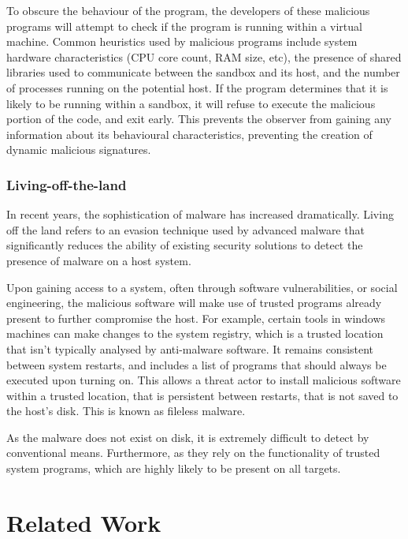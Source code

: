 \documentclass{report}
\begin{document}
To obscure the behaviour of the program, the developers of these malicious programs will attempt to check if the program is running within a virtual machine. Common heuristics used by malicious programs include system hardware characteristics (CPU core count, RAM size, etc), the presence of shared libraries used to communicate between the sandbox and its host, and the number of processes running on the potential host. If the program determines that it is likely to be running within a sandbox, it will refuse to execute the malicious portion of the code, and exit early. This prevents the observer from gaining any information about its behavioural characteristics, preventing the creation of dynamic malicious signatures. 

\subsubsection{Living-off-the-land}

In recent years, the sophistication of malware has increased dramatically. Living off the land refers to an evasion technique used by advanced malware that significantly reduces the ability of existing security solutions to detect the presence of malware on a host system. 

Upon gaining access to a system, often through software vulnerabilities, or social engineering, the malicious software will make use of trusted programs already present to further compromise the host. For example, certain tools in windows machines can make changes to the system registry, which is a trusted location that isn't typically analysed by anti-malware software. It remains consistent between system restarts, and includes a list of programs that should always be executed upon turning on. This allows a threat actor to install malicious software within a trusted location, that is persistent between restarts, that is not saved to the host's disk. This is known as fileless malware. 

As the malware does not exist on disk, it is extremely difficult to detect by conventional means. Furthermore, as they rely on the functionality of trusted system programs, which are highly likely to be present on all targets. 

\section{Related Work}
\end{document}
